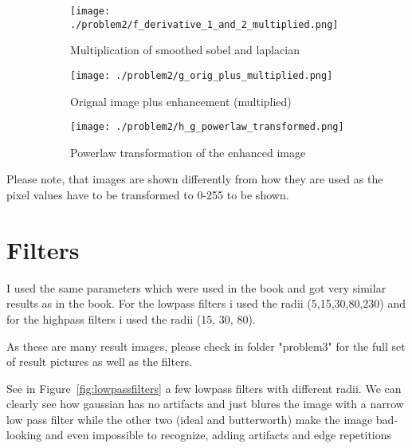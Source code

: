 \documentclass[a4paper]{scrartcl}
\begin{document}
\begin{figure}[H]
\begin{subfigure}[t]{0.3\textwidth}
        \texttt{[image: ./problem2/f\_derivative\_1\_and\_2\_multiplied.png]}
        \caption{Multiplication of smoothed sobel and laplacian}
    \end{subfigure}
    \begin{subfigure}[t]{0.3\textwidth}
        \texttt{[image: ./problem2/g\_orig\_plus\_multiplied.png]}
        \caption{Orignal image plus enhancement (multiplied)}
    \end{subfigure}
    \begin{subfigure}[t]{0.3\textwidth}
        \texttt{[image: ./problem2/h\_g\_powerlaw\_transformed.png]}
        \caption{Powerlaw transformation of the enhanced image}
    \end{subfigure}

    \caption{}
\end{figure}

Please note, that images are shown differently from how they are used as the pixel values have to be transformed to 0-255 to be shown.


\section{Filters}

I used the same parameters which were used in the book and got very similar results as in the book.
For the lowpass filters i used the radii (5,15,30,80,230) and for the highpass filters i used the radii (15, 30, 80).

As these are many result images, please check in folder "problem3" for the full set of result pictures as well as the filters.

See in Figure~\ref{fig:lowpassfilters} a few lowpass filters with different radii. We can clearly see how gaussian has no artifacts and just blures the image with a narrow low pass filter while the other two (ideal and butterworth) make the image bad-looking and even impossible to recognize, adding artifacts and edge repetitions
\end{document}
